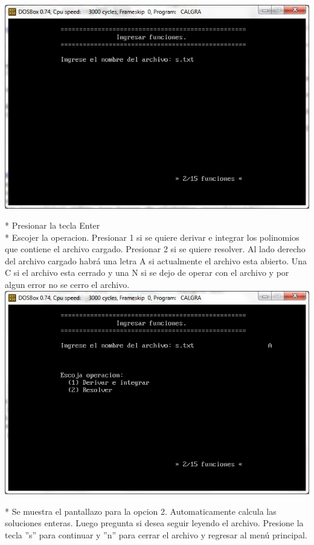 \documentclass[journal]{../../IEEEtran/IEEEtran}
\begin{document}
\includegraphics[scale=0.42]{img/31.jpg}

* Presionar la tecla Enter\\

* Escojer la operacion. Presionar 1 si se quiere derivar e integrar
los polinomios que contiene el archivo cargado. Presionar 2 si se
quiere resolver. Al lado derecho del archivo cargado habrá una letra A
si actualmente el archivo esta abierto. Una C si el archivo esta
cerrado y una N si se dejo de operar con el archivo y por algun error
no se cerro el archivo.\\

\includegraphics[scale=0.42]{img/32.jpg}

* Se muestra el pantallazo para la opcion 2. Automaticamente calcula
las soluciones enteras. Luego pregunta si desea seguir leyendo el
archivo. Presione la tecla ''s'' para continuar y ''n'' para cerrar el
archivo y regresar al menú principal.\\
\end{document}
